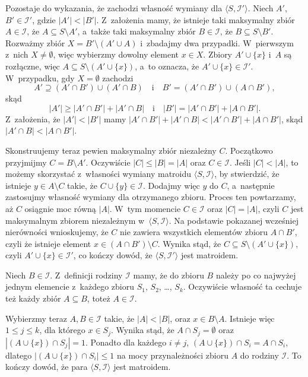 Pozostaje do wykazania, że zachodzi własność wymiany dla $\langle S,\mathcal{I}'\rangle$.
Niech $A'$, $B'\in\mathcal{I}'$, gdzie $|A'|<|B'|$.
Z~założenia mamy, że istnieje taki maksymalny zbiór $A\in\mathcal{I}$, że $A\subseteq S\setminus A'$, a~także taki maksymalny zbiór $B\in\mathcal{I}$, że $B\subseteq S\setminus B'$.
Rozważmy zbiór $X=B'\setminus(A'\cup A)$ i~zbadajmy dwa przypadki.
W~pierwszym z~nich $X\ne\emptyset$, więc wybierzmy dowolny element $x\in X$.
Zbiory $A'\cup\{x\}$ i~$A$ są rozłączne, więc $A\subseteq S\setminus(A'\cup\{x\})$, a~to oznacza, że $A'\cup\{x\}\in\mathcal{I}'$.
W~przypadku, gdy $X=\emptyset$ zachodzi
\[
	A' \supseteq (A'\cap B')\cup(A'\cap B) \quad\text{i}\quad B' = (A'\cap B')\cup(A\cap B'),
\]
skąd
\[
	|A'| \ge |A'\cap B'|+|A'\cap B| \quad\text{i}\quad |B'| = |A'\cap B'|+|A\cap B'|.
\]
Z~założenia, że $|A'|<|B'|$ mamy $|A'\cap B'|+|A'\cap B|<|A'\cap B'|+|A\cap B'|$, skąd $|A'\cap B|<|A\cap B'|$.

Skonstruujemy teraz pewien maksymalny zbiór niezależny $C$.
Początkowo przyjmijmy $C=B\setminus A'$.
Oczywiście $|C|\le|B|=|A|$ oraz $C\in\mathcal{I}$.
Jeśli $|C|<|A|$, to możemy skorzystać z~własności wymiany matroidu $\langle S,\mathcal{I}\rangle$, by stwierdzić, że istnieje $y\in A\setminus C$ takie, że $C\cup\{y\}\in\mathcal{I}$.
Dodajmy więc $y$ do $C$, a~następnie zastosujmy własność wymiany dla otrzymanego zbioru.
Proces ten powtarzamy, aż $C$ osiągnie moc równą $|A|$.
W~tym momencie $C\in\mathcal{I}$ oraz $|C|=|A|$, czyli $C$ jest maksymalnym zbiorem niezależnym w~$\langle S,\mathcal{I}\rangle$.
Na podstawie pokazanej wcześniej nierówności wnioskujemy, że $C$ nie zawiera wszystkich elementów zbioru $A\cap B'$, czyli że istnieje element $x\in(A\cap B')\setminus C$.
Wynika stąd, że $C\subseteq S\setminus(A'\cup\{x\})$, czyli $A'\cup\{x\}\in\mathcal{I}'$, co kończy dowód, że $\langle S,\mathcal{I}'\rangle$ jest matroidem.

\exercise %
Niech $B\in\mathcal{I}$.
Z~definicji rodziny $\mathcal{I}$ mamy, że do zbioru $B$ należy po co najwyżej jednym elemencie z~każdego zbioru $S_1$, $S_2$, \dots, $S_k$.
Oczywiście własność ta cechuje też każdy zbiór $A\subseteq B$, toteż $A\in\mathcal{I}$.

Wybierzmy teraz $A,B\in\mathcal{I}$ takie, że $|A|<|B|$, oraz $x\in B\setminus A$.
Istnieje więc $1\le j\le k$, dla którego $x\in S_j$.
Wynika stąd, że $A\cap S_j=\emptyset$ oraz $|(A\cup\{x\})\cap S_j|=1$.
Ponadto dla każdego $i\ne j$, $(A\cup\{x\})\cap S_i=A\cap S_i$, dlatego $|(A\cup\{x\})\cap S_i|\le1$ na mocy przynależności zbioru $A$ do rodziny $\mathcal{I}$.
To kończy dowód, że para $\langle S,\mathcal{I}\rangle$ jest matroidem.

